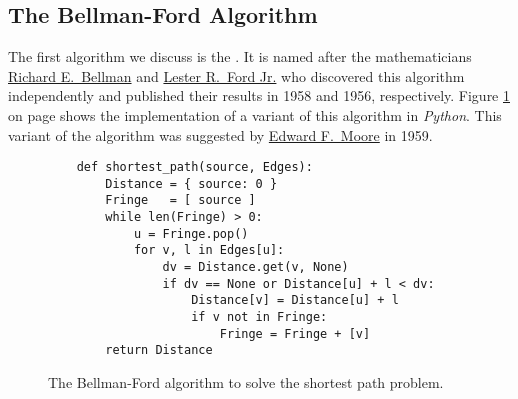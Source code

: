 \subsection{The Bellman-Ford Algorithm}
The first algorithm we discuss is the
\href{https://en.wikipedia.org/wiki/Bellman-Ford_algorithm}{}.
It is named after the mathematicians 
\href{https://en.wikipedia.org/wiki/Richard_E._Bellman}{Richard E.~Bellman} \cite{bellman:58} and 
\href{https://en.wikipedia.org/wiki/L._R._Ford_Jr.}{Lester R.~Ford Jr.} \cite{ford:56} who discovered this algorithm
independently and published their results in 1958 and 1956, respectively.  Figure
\ref{fig:Moore.ipynb} on page \pageref{fig:Moore.ipynb} shows the implementation of a variant of this 
algorithm in \textsl{Python}.  This variant of the algorithm was suggested by 
\href{https://en.wikipedia.org/wiki/Edward_F._Moore}{Edward F.~Moore} \cite{moore:59} 
in 1959.


\begin{figure}[!ht]
  \centering
\begin{verbatim}
    def shortest_path(source, Edges):
        Distance = { source: 0 }
        Fringe   = [ source ]
        while len(Fringe) > 0:
            u = Fringe.pop()
            for v, l in Edges[u]:
                dv = Distance.get(v, None)
                if dv == None or Distance[u] + l < dv:
                    Distance[v] = Distance[u] + l
                    if v not in Fringe: 
                        Fringe = Fringe + [v] 
        return Distance
\end{verbatim}
\vspace*{-0.3cm}
  \caption{The Bellman-Ford algorithm to solve the shortest path problem.}
  \label{fig:Moore.ipynb}
\end{figure} 

